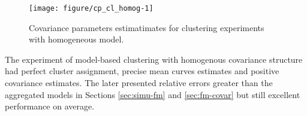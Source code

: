 \begin{figure}[t]\centering
\begin{knitrout}
\color{fgcolor}
\texttt{[image: figure/cp\_cl\_homog-1]} 

\end{knitrout}
\caption{Covariance parameters estimatimates for clustering experiments with homogeneous model.}
\label{fig:cl-homog-par}
\end{figure}




The experiment of model-based clustering with homogenous covariance structure had perfect cluster assignment, precise mean curves estimates and positive covariance estimates. The later presented relative errors greater than the aggregated models in Sections \ref{sec:simu-fm} and \ref{sec:fm-covar} but still excellent performance on average.



